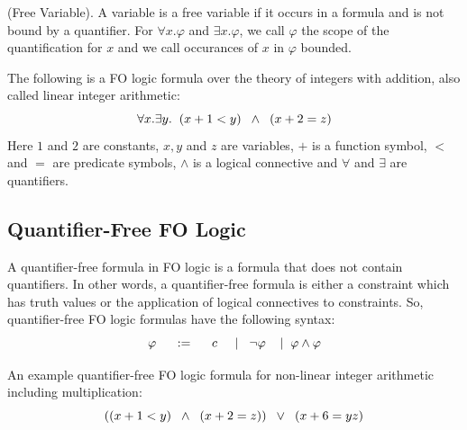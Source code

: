 \begin{definition}
\label{def:Free_Variables}
    (Free Variable).
    A variable is a free variable if it occurs in a formula and is not bound by a quantifier.
    For $\forall x. \varphi$ and $\exists x. \varphi$, we call $\varphi$ the scope of the quantification for $x$ and we call occurances of $x$ in $\varphi$ bounded.
\end{definition}

\begin{example}
    The following is a FO logic formula over the theory of integers with addition, also called linear integer arithmetic:
    $$  \forall x. \exists y. \hspace{2mm} (x + 1 < y) \hspace{2mm} \wedge  \hspace{2mm} (x + 2 = z) $$
    Here $1$ and $2$ are constants, $x, y$ and $z$ are variables, $+$ is a function symbol, $<$ and $=$ are predicate symbols, $\wedge$ is a logical connective and $\forall$ and $\exists$ are quantifiers.
\end{example}
\subsection{Quantifier-Free FO Logic}
\label{subsec:Quantifire_Free_FO_Logic}
A quantifier-free formula in FO logic is a formula that does not contain quantifiers.
In other words, a quantifier-free formula is either a constraint which has truth values or the application of logical connectives to constraints.
So, quantifier-free FO logic formulas have the following syntax:
$$\varphi\hspace{5mm}:=\hspace{5mm}c\hspace{5mm}|\hspace{3mm}\neg\varphi\hspace{4mm}|\hspace{2mm}\varphi\wedge\varphi$$

\begin{example}
    An example quantifier-free FO logic formula for non-linear integer arithmetic including multiplication:
    $$ ((x + 1 < y) \hspace{2mm} \wedge  \hspace{2mm} (x + 2 = z))  \hspace{2mm} \vee \hspace{2mm} (x + 6 = yz) $$
\end{example}

